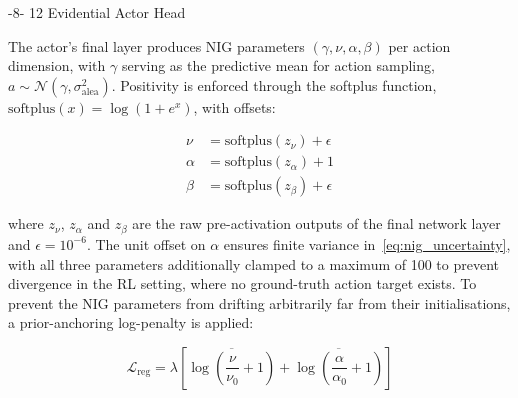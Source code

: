 \documentclass{sig-alternate}
\makeatletter
\renewcommand\subsection{\@startsection{subsection}{2}{\z@}%
    {-8\p@ \@plus -2\p@ \@minus -\p@}%
    {12\p@}%
    {\secfnt}}
\makeatother
\begin{document}





\subsection{Evidential Actor Head}

The actor's final layer produces NIG parameters $(\gamma, \nu, \alpha, \beta)$ per action dimension, with $\gamma$ serving as the predictive mean for action sampling, $a \sim \mathcal{N}(\gamma, \sigma^2_{\text{alea}})$. Positivity is enforced through the softplus function, $\text{softplus}(x) = \log(1 + e^x)$, with offsets:

\begin{align}
    \nu &= \text{softplus}(z_\nu) + \epsilon \nonumber \\
    \alpha &= \text{softplus}(z_\alpha) + 1 \nonumber \\
    \beta &= \text{softplus}(z_\beta) + \epsilon
    \label{eq:nig_constraints}
\end{align}

\noindent where $z_\nu$, $z_\alpha$ and $z_\beta$ are the raw pre-activation outputs of the final network layer and $\epsilon = 10^{-6}$. The unit offset on $\alpha$ ensures finite variance in~\cref{eq:nig_uncertainty}, with all three parameters additionally clamped to a maximum of 100 to prevent divergence in the RL setting, where no ground-truth action target exists. To prevent the NIG parameters from drifting arbitrarily far from their initialisations, a prior-anchoring log-penalty is applied:

\begin{equation}
    \mathcal{L}_{\text{reg}} = \lambda \left[ \overline{\log\!\left(\frac{\nu}{\nu_0} + 1\right)} + \overline{\log\!\left(\frac{\alpha}{\alpha_0} + 1\right)} \right]
    \label{eq:reg_loss}
\end{equation}
\end{document}
